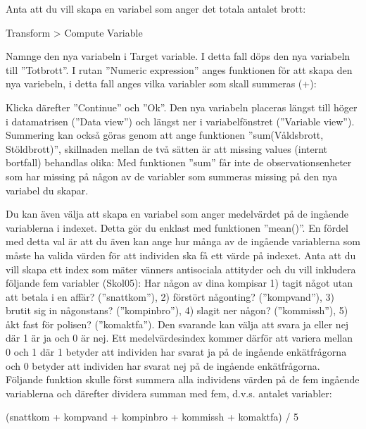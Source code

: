 \documentclass[
]{book}
\newenvironment{Shaded}{\begin{snugshade}}{\end{snugshade}}
\newcommand{\DecValTok}[1]{\textcolor[rgb]{0.00,0.00,0.81}{#1}}
\newcommand{\NormalTok}[1]{#1}
\newcommand{\SpecialCharTok}[1]{\textcolor[rgb]{0.00,0.00,0.00}{#1}}
\begin{document}
Anta att du vill skapa en variabel som anger det totala antalet brott:

Transform \textgreater{} Compute Variable

Namnge den nya variabeln i Target variable. I detta fall döps den nya variabeln till ''Totbrott''. I rutan
''Numeric expression'' anges funktionen för att skapa den nya variebeln, i detta fall anges vilka variabler
som skall summeras (+):

Klicka därefter ''Continue'' och ''Ok''. Den nya variabeln placeras längst till höger i datamatrisen (''Data
view'') och längst ner i variabelfönstret (''Variable view'').
Summering kan också göras genom att ange funktionen ''sum(Våldsbrott, Stöldbrott)'', skillnaden
mellan de två sätten är att missing values (internt bortfall) behandlas olika: Med funktionen ''sum'' får
inte de observationsenheter som har missing på någon av de variabler som summeras missing på den
nya variabel du skapar.

Du kan även välja att skapa en variabel som anger medelvärdet på de ingående variablerna i indexet.
Detta gör du enklast med funktionen ''mean()''. En fördel med detta val är att du även kan ange hur
många av de ingående variablerna som måste ha valida värden för att individen ska få ett värde på
indexet. Anta att du vill skapa ett index som mäter vänners antisociala attityder och du vill inkludera
följande fem variabler (Skol05): Har någon av dina kompisar 1) tagit något utan att betala i en affär?
(''snattkom''), 2) förstört någonting? (''kompvand''), 3) brutit sig in någonstans? (''kompinbro''), 4) slagit
ner någon? (''kommissh''), 5) åkt fast för polisen? (''komaktfa''). Den svarande kan välja att svara ja eller
nej där 1 är ja och 0 är nej. Ett medelvärdesindex kommer därför att variera mellan 0 och 1 där 1
betyder att individen har svarat ja på de ingående enkätfrågorna och 0 betyder att individen har svarat
nej på de ingående enkätfrågorna. Följande funktion skulle först summera alla individens värden på de
fem ingående variablerna och därefter dividera summan med fem, d.v.s. antalet variabler:

\begin{Shaded}
\begin{Highlighting}[]
\NormalTok{(snattkom }\SpecialCharTok{+}\NormalTok{ kompvand }\SpecialCharTok{+}\NormalTok{ kompinbro }\SpecialCharTok{+}\NormalTok{ kommissh }\SpecialCharTok{+}\NormalTok{ komaktfa) }\SpecialCharTok{/} \DecValTok{5}
\end{Highlighting}
\end{Shaded}
\end{document}
